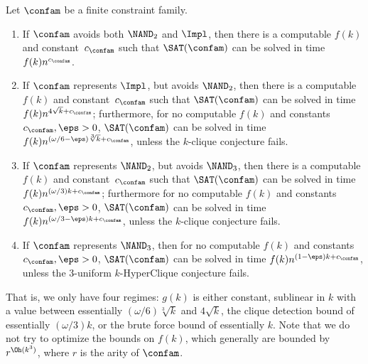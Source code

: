 \begin{thm}
Let $\confam$ be a finite constraint family.
\begin{enumerate}
\item {} If $\confam$ avoids both $\NAND_2$ and $\Impl$, then there is a computable $f(k)$ and constant~$c_\confam$ such that $\SAT(\confam)$ can be solved in time $f(k)n^{c_\confam}$.
\item {}\newline If $\confam$ represents $\Impl$, but avoids $\NAND_2$, then there is a computable $f(k)$ and constant~$c_\confam$ such that $\SAT(\confam)$ can be solved in time $f(k)n^{4\sqrt{k}+c_\confam}$; \newline furthermore, for no computable $f(k)$ and constants $c_\confam, \eps > 0$, $\SAT(\confam)$ can be solved in time  $f(k)n^{(\omega/6-\eps)\sqrt[3]{k}+c_\confam}$, unless the $k$-clique conjecture fails.
\item {}\newline  If $\confam$ represents $\NAND_2$, but avoids $\NAND_3$, then there is a computable $f(k)$ and constant~$c_\confam$ such that $\SAT(\confam)$ can be solved in time $f(k) n^{(\omega/3)k+c_\confam}$; \newline furthermore for no computable $f(k)$ and constants $c_\confam, \eps > 0$, $\SAT(\confam)$ can be solved in time $f(k) n^{(\omega/3-\eps)k+c_\confam}$, unless the $k$-clique conjecture fails. 
\item {}\newline  If $\confam$ represents $\NAND_3$, then for no computable $f(k)$ and constants $c_\confam, \eps > 0$, $\SAT(\confam)$ can be solved in time $f(k)n^{(1-\eps)k+c_\confam}$, unless the 3-uniform $k$-HyperClique conjecture fails. 
\end{enumerate}
\end{thm}
%
%
That is, we only have four regimes: $g(k)$ is either constant, sublinear in $k$ with a value between essentially $(\omega/6) \sqrt[3]{k}$ and $4\sqrt{k}$, the clique detection bound of essentially $(\omega/3) k$, or the brute force bound of essentially $k$.  Note that we do not try to optimize the bounds on $f(k)$, which generally are bounded by $r^{\Oh(k^3)}$, where $r$ is the arity of $\confam$.
%
